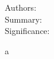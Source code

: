 \begin{description}
    \item[] \textit{} \cite{}
    \item[Authors:]
    \item[Summary:]
    \item[Significance:]
\end{description}

\begin{inparaenum}[(i)]
    \item a
\end{inparaenum}